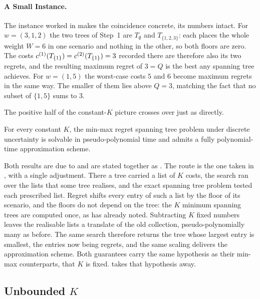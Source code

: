 \paragraph{A Small Instance.}

The instance worked in  makes the coincidence concrete, its numbers intact.
For $w = (3, 1, 2)$ the two trees of Step~1 are $T_\emptyset$ and $T_{\{1,2,3\}}$: each places the whole weight $W = 6$ in one scenario and nothing in the other, so both floors are zero.
The costs $c^{(1)}(T_{\{1\}}) = c^{(2)}(T_{\{1\}}) = 3$ recorded there are therefore also its two regrets, and the resulting maximum regret of $3 = Q$ is the best any spanning tree achieves.
For $w = (1, 5)$ the worst-case costs $5$ and $6$ become maximum regrets in the same way.
The smaller of them lies above $Q = 3$, matching the fact that no subset of $\{1, 5\}$ sums to $3$.

The positive half of the constant-$K$ picture crosses over just as directly.

\begin{theorem}\label{thm:regret-kconst-pseudo}
For every constant $K$, the min-max regret spanning tree problem under discrete uncertainty is solvable in pseudo-polynomial time and admits a fully polynomial-time approximation scheme.
\end{theorem}

Both results are due to \textcite{AissiBazganVanderpooten2005ESA} and are stated together as \cite[Theorem~8.6]{Goerigk2021RCO}.
The route is the one taken in , with a single adjustment.
There a tree carried a list of $K$ costs, the search ran over the lists that some tree realises, and the exact spanning tree problem tested each prescribed list.
Regret shifts every entry of such a list by the floor of its scenario, and the floors do not depend on the tree: the $K$ minimum spanning trees are computed once, as  has already noted.
Subtracting $K$ fixed numbers leaves the realisable lists a translate of the old collection, pseudo-polynomially many as before.
The same search therefore returns the tree whose largest entry is smallest, the entries now being regrets, and the same scaling delivers the approximation scheme.
Both guarantees carry the same hypothesis as their min-max counterparts, that $K$ is fixed.
 takes that hypothesis away.

\subsection{Unbounded \texorpdfstring{$K$}{K}}\label{sec:regret-kunbdd}

